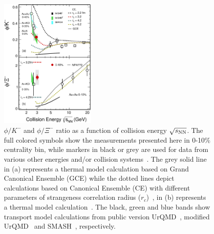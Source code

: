 \documentclass[%
 reprint,	
showpacs,
 amsmath,amssymb,
 aps,
 prc,
]{revtex4-1}
\begin{document}
\begin{figure}
\centering
\includegraphics[width=0.42\textwidth]{fig/fig4_phi_over_kminus_zoomin.eps}
  \caption{ $\phi/K^-$ and $\phi/\Xi^-$ ratio as a function of collision energy $\sqrt{s_{\rm NN}}$. The full colored symbols show the measurements presented here in 0-10\% centrality bin, while markers in black or grey are used for data from various other energies and/or collision systems~\cite{E917_phi,NA49_phi,FOPI_phi_AlAl,FOPI_phi_NiNi,HADES_phi_ArKCl,HADES_phi_AuAu,Xi_ArKCl_HADES,star_bes_strangeness}. The grey solid line in (a) represents a thermal model calculation based on Grand Canonical Ensemble (GCE) while the dotted lines depict calculations based on Canonical Ensemble (CE) with different parameters of strangeness correlation radius ($r_c$)~\cite{Redlich_CE,Redlich_CE_private}, in (b) represents a thermal model calculation~\cite{ANDRONIC2006167_SHM}. The black, green and blue bands show transport model calculations from public version UrQMD~\cite{urQMD,UrQMD_2}, modified UrQMD~\cite{Steinheimer_2015_UrQMD} and SMASH~\cite{Elfner_SMASH}, respectively.}
\label{fig:phi2Kratio} 
\end{figure}
\end{document}
